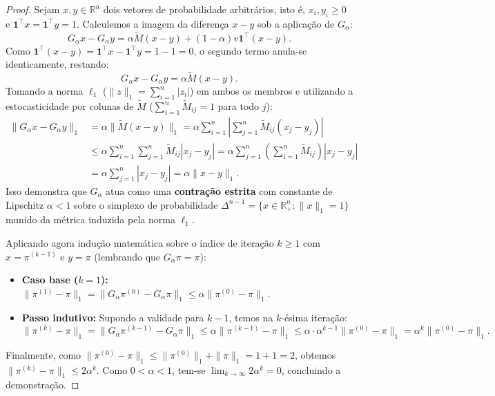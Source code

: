\documentclass[10pt,a4paper]{article}
\theoremstyle{definition}
\theoremstyle{plain}
\theoremstyle{remark}
\begin{document}
\begin{proof}
Sejam $x, y \in \mathbb{R}^n$ dois vetores de probabilidade arbitrários, isto é, $x_i, y_i \ge 0$ e $\mathbf{1}^{\top} x = \mathbf{1}^{\top} y = 1$. Calculemos a imagem da diferença $x - y$ sob a aplicação de $G_{\alpha}$:
\[
G_{\alpha} x - G_{\alpha} y = \alpha \widetilde{M}(x - y) + (1 - \alpha) v \mathbf{1}^{\top}(x - y).
\]
Como $\mathbf{1}^{\top}(x - y) = \mathbf{1}^{\top} x - \mathbf{1}^{\top} y = 1 - 1 = 0$, o segundo termo anula-se identicamente, restando:
\[
G_{\alpha} x - G_{\alpha} y = \alpha \widetilde{M}(x - y).
\]
Tomando a norma $\ell_1$ ($\|z\|_1 = \sum_{i=1}^{n} |z_i|$) em ambos os membros e utilizando a estocasticidade por colunas de $\widetilde{M}$ ($\sum_{i=1}^{n} \widetilde{M}_{ij} = 1$ para todo $j$):
\begin{align*}
\|G_{\alpha} x - G_{\alpha} y\|_1 &= \alpha \|\widetilde{M}(x - y)\|_1 = \alpha \sum_{i=1}^{n} \left| \sum_{j=1}^{n} \widetilde{M}_{ij} (x_j - y_j) \right| \\
&\le \alpha \sum_{i=1}^{n} \sum_{j=1}^{n} \widetilde{M}_{ij} |x_j - y_j| = \alpha \sum_{j=1}^{n} \left( \sum_{i=1}^{n} \widetilde{M}_{ij} \right) |x_j - y_j| \\
&= \alpha \sum_{j=1}^{n} |x_j - y_j| = \alpha \|x - y\|_1.
\end{align*}
Isso demonstra que $G_{\alpha}$ atua como uma \textbf{contração estrita} com constante de Lipschitz $\alpha < 1$ sobre o simplexo de probabilidade $\Delta^{n-1} = \{x \in \mathbb{R}^n_{+} : \|x\|_1 = 1\}$ munido da métrica induzida pela norma $\ell_1$.

Aplicando agora indução matemática sobre o índice de iteração $k \ge 1$ com $x = \pi^{(k-1)}$ e $y = \pi$ (lembrando que $G_{\alpha}\pi = \pi$):
\begin{itemize}
    \item \textbf{Caso base ($k = 1$):} $\|\pi^{(1)} - \pi\|_1 = \|G_{\alpha}\pi^{(0)} - G_{\alpha}\pi\|_1 \le \alpha \|\pi^{(0)} - \pi\|_1$.
    \item \textbf{Passo indutivo:} Supondo a validade para $k - 1$, temos na $k$-ésima iteração:
    \[
    \|\pi^{(k)} - \pi\|_1 = \|G_{\alpha}\pi^{(k-1)} - G_{\alpha}\pi\|_1 \le \alpha \|\pi^{(k-1)} - \pi\|_1 \le \alpha \cdot \alpha^{k-1} \|\pi^{(0)} - \pi\|_1 = \alpha^k \|\pi^{(0)} - \pi\|_1.
    \]
\end{itemize}
Finalmente, como $\|\pi^{(0)} - \pi\|_1 \le \|\pi^{(0)}\|_1 + \|\pi\|_1 = 1 + 1 = 2$, obtemos $\|\pi^{(k)} - \pi\|_1 \le 2\alpha^k$. Como $0 < \alpha < 1$, tem-se $\lim_{k \to \infty} 2\alpha^k = 0$, concluindo a demonstração.
\end{proof}
\end{document}
